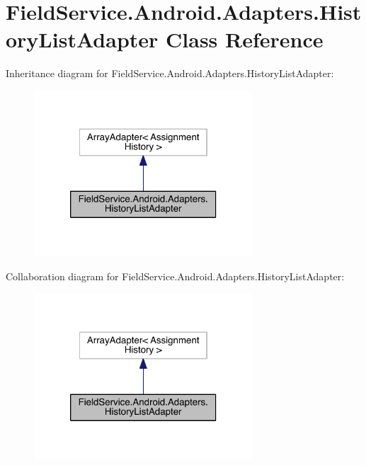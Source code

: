\hypertarget{class_field_service_1_1_android_1_1_adapters_1_1_history_list_adapter}{\section{Field\+Service.\+Android.\+Adapters.\+History\+List\+Adapter Class Reference}
\label{class_field_service_1_1_android_1_1_adapters_1_1_history_list_adapter}
}


Inheritance diagram for Field\+Service.\+Android.\+Adapters.\+History\+List\+Adapter\+:
\nopagebreak
\begin{figure}[H]
\begin{center}
\leavevmode
\includegraphics[width=232pt]{class_field_service_1_1_android_1_1_adapters_1_1_history_list_adapter__inherit__graph}
\end{center}
\end{figure}


Collaboration diagram for Field\+Service.\+Android.\+Adapters.\+History\+List\+Adapter\+:
\nopagebreak
\begin{figure}[H]
\begin{center}
\leavevmode
\includegraphics[width=232pt]{class_field_service_1_1_android_1_1_adapters_1_1_history_list_adapter__coll__graph}
\end{center}
\end{figure}
